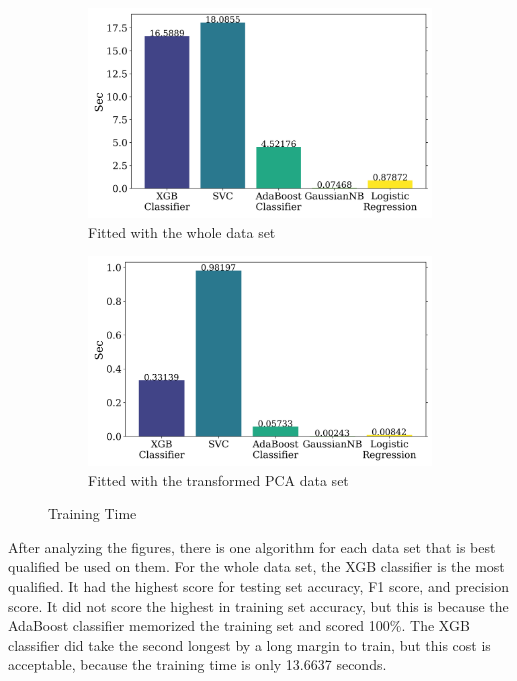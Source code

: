 \documentclass{article}
\begin{document}
\begin{figure}[H]
    \centering
    \begin{subfigure}[t]{0.495\textwidth}
        \centering
        \includegraphics[width=\textwidth]{time_notpca.png}
        \caption{Fitted with the whole data set}
        \label{fig:time_notpca}
    \end{subfigure}
    \hfill
    \begin{subfigure}[t]{0.495\textwidth}
        \centering
        \includegraphics[width=\textwidth]{time_pca.png}
        \caption{Fitted with the transformed PCA data set}
        \label{fig:time_pca}
    \end{subfigure}
    \caption{Training Time}
    \label{fig:time}
\end{figure}

\par
After analyzing the figures, there is one algorithm for each data set that is best qualified be used on them. For the whole data set, the XGB classifier is the most qualified. It had the highest score for testing set accuracy, F1 score, and precision score. It did not score the highest in training set accuracy, but this is because the AdaBoost classifier memorized the training set and scored 100\%. The XGB classifier did take the second longest by a long margin to train, but this cost is acceptable, because the training time is only 13.6637 seconds.
\end{document}
